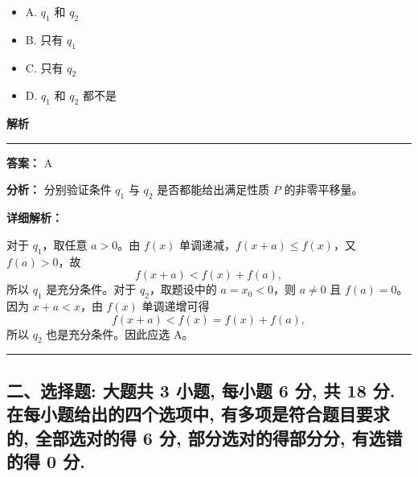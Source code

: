 \documentclass[UTF8,12pt,a4paper]{ctexart}
\newenvironment{examSolutionBox}{%
  \par\medskip\begingroup
  \setlength{\leftskip}{1.0em}\setlength{\rightskip}{0.9em}%
  \noindent\textcolor{SolutionTeal}{\bfseries\large 解析}\par
  \smallskip\noindent\textcolor{SolutionRule}{\rule{\dimexpr\linewidth-\leftskip-\rightskip\relax}{0.8pt}}\par
  \smallskip\color{SolutionInk}%
}{%
  \par\smallskip\noindent\textcolor{SolutionRule}{\rule{\dimexpr\linewidth-\leftskip-\rightskip\relax}{0.8pt}}\par
  \endgroup\medskip
}
\providecommand{\tightlist}{%
  \setlength{\itemsep}{0pt}\setlength{\parskip}{0pt}}
\begin{document}
\begin{enumerate}
  \begin{itemize}
  \tightlist
  \item
    A. \(q_{1}\) 和 \(q_{2}\)
  \item
    B. 只有 \(q_{1}\)
  \item
    C. 只有 \(q_{2}\)
  \item
    D. \(q_{1}\) 和 \(q_{2}\) 都不是
  \end{itemize}

  \begin{examSolutionBox}

  \textbf{答案：} A

  \textbf{分析：} 分别验证条件 \(q_1\) 与 \(q_2\) 是否都能给出满足性质 \(P\) 的非零平移量。

  \textbf{详细解析：}

  对于 \(q_1\)，取任意 \(a>0\)。由 \(f(x)\) 单调递减，\(f(x+a)\leqslant f(x)\)，又 \(f(a)>0\)，故
  \[
  f(x+a)<f(x)+f(a),
  \]
  所以 \(q_1\) 是充分条件。对于 \(q_2\)，取题设中的 \(a=x_0<0\)，则 \(a\neq 0\) 且 \(f(a)=0\)。因为 \(x+a<x\)，由 \(f(x)\) 单调递增可得
  \[
  f(x+a)<f(x)=f(x)+f(a),
  \]
  所以 \(q_2\) 也是充分条件。因此应选 A。

  \end{examSolutionBox}
\end{enumerate}

\subsection{二、选择题: 大题共 3 小题, 每小题 6 分, 共 18 分. 在每小题给出的四个选项中, 有多项是符合题目要求的, 全部选对的得 6 分, 部分选对的得部分分, 有选错的得 0 分.}\label{ux4e8cux9009ux62e9ux9898-ux5927ux9898ux5171-3-ux5c0fux9898-ux6bcfux5c0fux9898-6-ux5206-ux5171-18-ux5206.-ux5728ux6bcfux5c0fux9898ux7ed9ux51faux7684ux56dbux4e2aux9009ux9879ux4e2d-ux6709ux591aux9879ux662fux7b26ux5408ux9898ux76eeux8981ux6c42ux7684-ux5168ux90e8ux9009ux5bf9ux7684ux5f97-6-ux5206-ux90e8ux5206ux9009ux5bf9ux7684ux5f97ux90e8ux5206ux5206-ux6709ux9009ux9519ux7684ux5f97-0-ux5206.}
\end{document}
